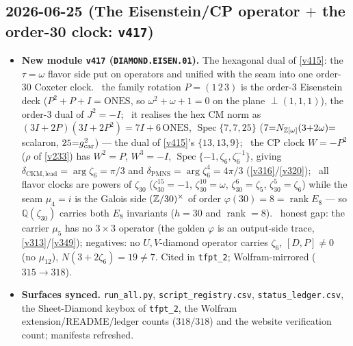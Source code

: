 \subsection*{2026-06-25 (The Eisenstein/CP operator $+$ the order-30 clock: \texttt{v417})}
\begin{itemize}
\item \textbf{New module \texttt{v417} (\texttt{DIAMOND.EISEN.01}).} The hexagonal dual of \vref{v415}:
the $\tau{=}\omega$ flavor side put on operators and unified with the seam into one order-$30$ Coxeter
clock. \mE\ the family rotation $P=(1\,2\,3)$ is the order-$3$ Eisenstein deck ($P^2{+}P{+}I=\mathrm{ONES}$,
so $\omega^2{+}\omega{+}1{=}0$ on the plane $\perp(1,1,1)$), the order-$3$ dual of $J^2{=}{-}I$; \mE\ it
realises the hex CM norm as $(3I{+}2P)(3I{+}2P^2)=7I{+}6\,\mathrm{ONES}$, $\operatorname{Spec}\{7,7,25\}$
($7{=}N_{\mathbb{Z}[\omega]}(3{+}2\omega){=}$ scalaron, $25{=}g_{\mathrm{car}}^2$) --- the dual of \vref{v415}'s
$\{13,13,9\}$; \mE\ the CP clock $W{=}{-}P^2$ ($\rho$ of \vref{v233}) has $W^2{=}P$, $W^3{=}{-}I$,
$\operatorname{Spec}\{-1,\zeta_6,\zeta_6^{-1}\}$, giving $\delta_{\mathrm{CKM,lead}}{=}\arg\zeta_6{=}\pi/3$
and $\delta_{\mathrm{PMNS}}{=}\arg\zeta_6^4{=}4\pi/3$ (\vref{v316}/\vref{v320}); \mE\ all flavor clocks are
powers of $\zeta_{30}$ ($\zeta_{30}^{15}{=}{-}1$, $\zeta_{30}^{10}{=}\omega$, $\zeta_{30}^{6}{=}\zeta_5$,
$\zeta_{30}^{5}{=}\zeta_6$) while the seam $\mu_4{=}i$ is the Galois side $(\mathbb{Z}/30)^\times$ of order
$\varphi(30){=}8{=}\operatorname{rank}E_8$ --- so $\mathbb Q(\zeta_{30})$ carries both $E_8$ invariants
($h{=}30$ and $\operatorname{rank}{=}8$). \mC\ honest gap: the carrier $\mu_5$ has no $3{\times}3$
operator (the golden $\varphi$ is an output-side trace, \vref{v313}/\vref{v349}); negatives: no
$U,V$-diamond operator carries $\zeta_6$, $[D,P]\neq0$ (no $\mu_{12}$), $N(3{+}2\zeta_6){=}19{\neq}7$.
Cited in \texttt{tfpt\_2}; Wolfram-mirrored ($315\to318$).
\item \textbf{Surfaces synced.} \texttt{run\_all.py}, \texttt{script\_registry.csv},
\texttt{status\_ledger.csv}, the Sheet-Diamond keybox of \texttt{tfpt\_2}, the Wolfram
extension/README/ledger counts ($318/318$) and the website verification count; manifests refreshed.
\end{itemize}

